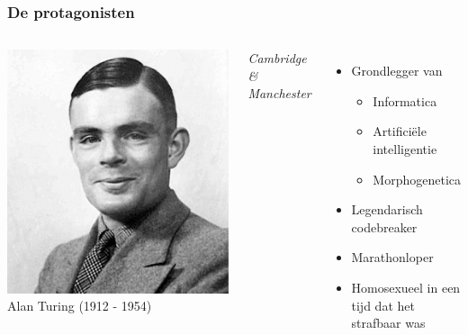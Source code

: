 \documentclass{beamer}
\begin{document}
\begin{frame}
    \frametitle{De protagonisten}
    \begin{columns}
        \includegraphics[width=\textwidth]{Turing.jpg}
        {\Large Alan Turing} (1912 - 1954) 

        \emph{Cambridge \& Manchester}
        \begin{itemize}
            \item Grondlegger van
            \begin{itemize}
                \item<2-> Informatica
                \item<3-> Artificiële intelligentie
                \item<4-> Morphogenetica
            \end{itemize}
            \item<5-> Legendarisch codebreaker
            \item<6-> Marathonloper
            \item<7-> Homosexueel in een tijd dat het strafbaar was
        \end{itemize}    
    \end{columns}
\end{frame}
\end{document}
